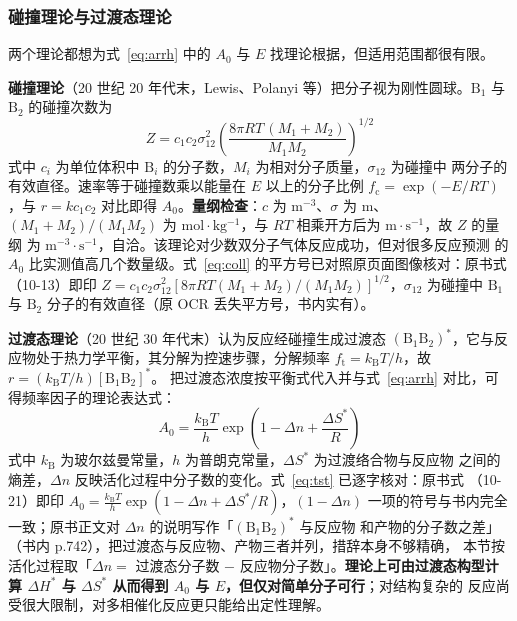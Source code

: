 \subsubsection{碰撞理论与过渡态理论}

两个理论都想为式~\eqref{eq:arrh} 中的 $A_0$ 与 $E$ 找理论根据，但适用范围都很有限。

\textbf{碰撞理论}（20 世纪 20 年代末，Lewis、Polanyi 等）把分子视为刚性圆球。$\mathrm{B}_1$
与 $\mathrm{B}_2$ 的碰撞次数为
\begin{equation}
Z=c_1c_2\sigma_{12}^{2}
\left(\frac{8\pi RT\,(M_1+M_2)}{M_1M_2}\right)^{1/2}
\label{eq:coll}
\end{equation}
式中 $c_i$ 为单位体积中 $\mathrm{B}_i$ 的分子数，$M_i$ 为相对分子质量，$\sigma_{12}$ 为碰撞中
两分子的有效直径。速率等于碰撞数乘以能量在 $E$ 以上的分子比例
$f_{\mathrm c}=\exp(-E/RT)$，与 $r=kc_1c_2$ 对比即得 $A_0$。\textbf{量纲检查}：$c$ 为
$\mathrm{m^{-3}}$、$\sigma$ 为 $\mathrm{m}$、$(M_1+M_2)/(M_1M_2)$ 为
$\mathrm{mol{\cdot}kg^{-1}}$，与 $RT$ 相乘开方后为 $\mathrm{m{\cdot}s^{-1}}$，故 $Z$ 的量纲
为 $\mathrm{m^{-3}{\cdot}s^{-1}}$，自洽。该理论对少数双分子气体反应成功，但对很多反应预测
的 $A_0$ 比实测值高几个数量级。式~\eqref{eq:coll} 的平方号已对照原页面图像核对：原书式（10-13）即印
$Z=c_1c_2\sigma_{12}^{2}[8\pi RT(M_1+M_2)/(M_1M_2)]^{1/2}$，$\sigma_{12}$ 为碰撞中
$\mathrm{B}_1$ 与 $\mathrm{B}_2$ 分子的有效直径（原 OCR 丢失平方号，书内实有）。

\textbf{过渡态理论}（20 世纪 30 年代末）认为反应经碰撞生成过渡态
$(\mathrm{B}_1\mathrm{B}_2)^{*}$，它与反应物处于热力学平衡，其分解为控速步骤，分解频率
$f_{\mathrm t}=k_{\mathrm B}T/h$，故 $r=(k_{\mathrm B}T/h)[\mathrm{B}_1\mathrm{B}_2]^{*}$。
把过渡态浓度按平衡式代入并与式~\eqref{eq:arrh} 对比，可得频率因子的理论表达式：
\begin{equation}
A_0=\frac{k_{\mathrm B}T}{h}\exp\!\left(1-\Delta n+\frac{\Delta S^{*}}{R}\right)
\label{eq:tst}
\end{equation}
式中 $k_{\mathrm B}$ 为玻尔兹曼常量，$h$ 为普朗克常量，$\Delta S^{*}$ 为过渡络合物与反应物
之间的熵差，$\Delta n$ 反映活化过程中分子数的变化。式~\eqref{eq:tst} 已逐字核对：原书式
（10-21）即印 $A_0=\frac{k_{\mathrm B}T}{h}\exp(1-\Delta n+\Delta S^{*}/R)$，$(1-\Delta n)$
一项的符号与书内完全一致；原书正文对 $\Delta n$ 的说明写作「$(\mathrm{B_1B_2})^{*}$ 与反应物
和产物的分子数之差」（书内 p.742），把过渡态与反应物、产物三者并列，措辞本身不够精确，
本节按活化过程取「$\Delta n=$ 过渡态分子数 $-$ 反应物分子数」。\textbf{理论上可由过渡态构型计算
$\Delta H^{*}$ 与 $\Delta S^{*}$ 从而得到 $A_0$ 与 $E$，但仅对简单分子可行}；对结构复杂的
反应尚受很大限制，对多相催化反应更只能给出定性理解。

